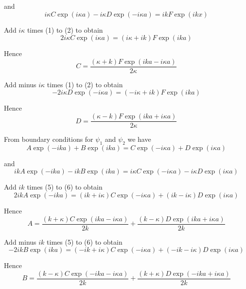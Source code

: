 and
\begin{equation*}
i\kappa C\exp(i\kappa a)-i\kappa D\exp(-i\kappa a)=ikF\exp(ikx)\tag{2}
\end{equation*}

Add $i\kappa$ times (1) to (2) to obtain
\begin{equation*}
2i\kappa C\exp(i\kappa a)=(i\kappa+ik)F\exp(ika)
\end{equation*}

Hence
\begin{equation*}
C=\frac{(\kappa+k)F\exp(ika-i\kappa a)}{2\kappa}\tag{3}
\end{equation*}

Add minus $i\kappa$ times (1) to (2) to obtain
\begin{equation*}
-2i\kappa D\exp(-i\kappa a)=(-i\kappa+ik)F\exp(ika)
\end{equation*}

Hence
\begin{equation*}
D=\frac{(\kappa-k)F\exp(ika+i\kappa a)}{2\kappa}\tag{4}
\end{equation*}

From boundary conditions for $\psi_1$ and $\psi_2$ we have
\begin{equation*}
A\exp(-ika)+B\exp(ika)=C\exp(-i\kappa a)+D\exp(i\kappa a)\tag{5}
\end{equation*}

and
\begin{equation*}
ikA\exp(-ika)-ikB\exp(ika)=i\kappa C\exp(-i\kappa a)-i\kappa D\exp(i\kappa a)\tag{6}
\end{equation*}

Add $ik$ times (5) to (6) to obtain
\begin{equation*}
2ikA\exp(-ika)=(ik+i\kappa)C\exp(-i\kappa a)+(ik-i\kappa)D\exp(i\kappa a)
\end{equation*}

Hence
\begin{equation*}
A=\frac{(k+\kappa)C\exp(ika-i\kappa a)}{2k}+\frac{(k-\kappa)D\exp(ika+i\kappa a)}{2k}\tag{7}
\end{equation*}

Add minus $ik$ times (5) to (6) to obtain
\begin{equation*}
-2ikB\exp(ika)=(-ik+i\kappa)C\exp(-i\kappa a)+(-ik-i\kappa)D\exp(i\kappa a)
\end{equation*}

Hence
\begin{equation*}
B=\frac{(k-\kappa)C\exp(-ika-i\kappa a)}{2k}+\frac{(k+\kappa)D\exp(-ika+i\kappa a)}{2k}\tag{8}
\end{equation*}

